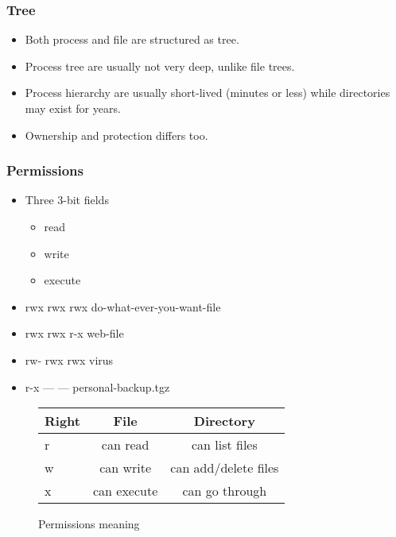   \begin{frame}
    \frametitle{Tree}
      \begin{itemize}
        \item Both process and file are structured as tree.
        \item Process tree are usually not very deep, unlike file trees.
        \item Process hierarchy are usually short-lived (minutes or less) while directories may exist for years.
        \item Ownership and protection differs too.
      \end{itemize}
  \end{frame}

  \begin{frame}
    \frametitle{Permissions}
      \begin{itemize}
        \item Three 3-bit fields
          \begin{itemize}
            \item r{\color{gray}ead}
            \item w{\color{gray}rite}
            \item {\color{gray}e}x{\color{gray}ecute}
          \end{itemize}
        \item {\color{OliveGreen}rwx} {\color{Marroon}rwx} {\color{fuchsia}rwx} do-what-ever-you-want-file
        \item {\color{OliveGreen}rwx} {\color{Marroon}rwx} {\color{fuchsia}r-x} web-file
        \item {\color{OliveGreen}rw-} {\color{Marroon}rwx} {\color{fuchsia}rwx} virus
        \item {\color{OliveGreen}r-x} {\color{Marroon}---} {\color{fuchsia}---} personal-backup.tgz
      \end{itemize}
    \begin{figure}
      \centering
      \begin{tabular}{l|c|c}
        Right  & File  & Directory \\ \hline
        r & can read   & can list files \\ \hline
        w & can write  & can add/delete files \\ \hline
        x & can execute& can go through \\ \hline
      \end{tabular}
      \caption{Permissions meaning}
      \label{fig:tab-right}
    \end{figure}
  \end{frame}



